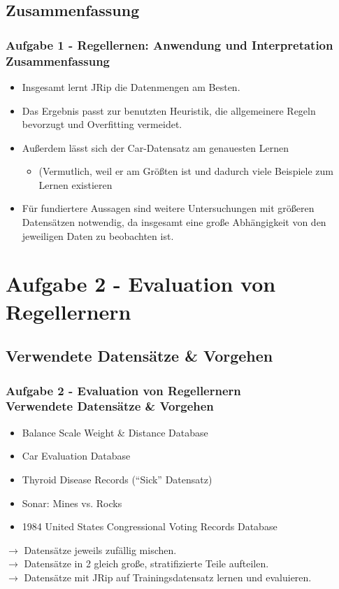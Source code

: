 \documentclass[accentcolor=tud6b,colorbacktitle,inverttitle,landscape,german,presentation,t]{tudbeamer}
\begin{document}
    \subsection{Zusammenfassung}    
    \begin{frame}[t]
    \frametitle{Aufgabe 1 - Regellernen: Anwendung und Interpretation\\ Zusammenfassung}
        \begin{itemize}
            \item Insgesamt lernt JRip die Datenmengen am Besten.
            \item Das Ergebnis passt zur benutzten Heuristik, die allgemeinere Regeln bevorzugt und Overfitting vermeidet.
            \item Außerdem lässt sich der Car-Datensatz am genauesten Lernen 
            \begin{itemize}
                \item (Vermutlich, weil er am Größten ist und dadurch viele Beispiele zum Lernen existieren
            \end{itemize}
            \item Für fundiertere Aussagen sind weitere Untersuchungen mit größeren Datensätzen notwendig, da insgesamt eine große Abhängigkeit von den jeweiligen Daten zu beobachten ist.
        \end{itemize}
    \end{frame}
    
    \section{Aufgabe 2 - Evaluation von Regellernern}
    
    \subsection{Verwendete Datensätze \& Vorgehen}
    
    \begin{frame}[t]
    \frametitle{Aufgabe 2 - Evaluation von Regellernern\\ Verwendete Datensätze \& Vorgehen}
        \begin{itemize}
            \item Balance Scale Weight \& Distance Database
            \item Car Evaluation Database
            \item Thyroid Disease Records (``Sick'' Datensatz)
            \item Sonar: Mines vs. Rocks
            \item 1984 United States Congressional Voting Records Database
        \end{itemize}
        \vfill
        $\rightarrow$ Datensätze jeweils zufällig mischen.\\
        $\rightarrow$ Datensätze in 2 gleich große, stratifizierte Teile aufteilen.\\
        $\rightarrow$ Datensätze mit JRip auf Trainingsdatensatz lernen und evaluieren.
    \end{frame}
    
\end{document}
